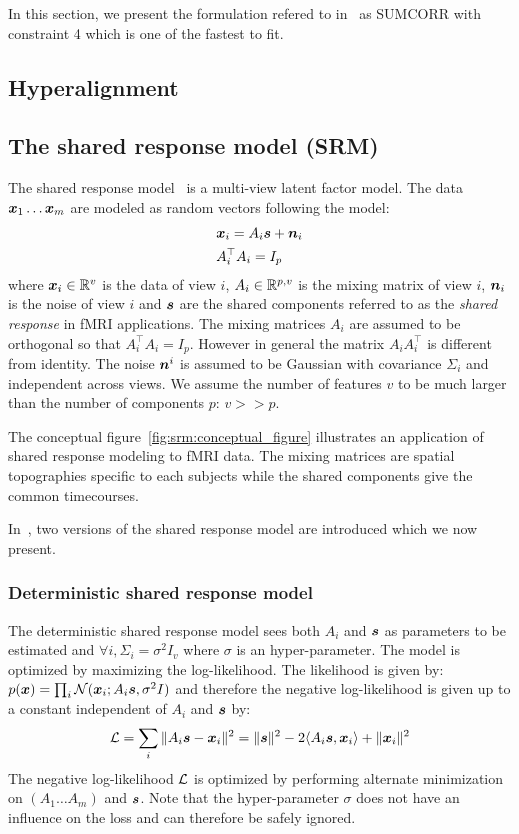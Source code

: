 In this section, we present the formulation refered to
in~\cite{nielsen2002multiset} as SUMCORR with constraint 4 which is one of the
fastest to fit.

\subsection{Hyperalignment}

\subsection{The shared response model (SRM)}
The shared response model~\cite{chen2015reduced} is a multi-view latent factor
model. The data $\boldsymbol{x}_1 \dots \boldsymbol{x}_m$ are modeled as random vectors following the model:
\begin{align}
 &\boldsymbol{x}_i = A_i \boldsymbol{s} + \boldsymbol{n}_i \\
  &A_i^{\top}A_i = I_p
  \label{eq:model:srm}
\end{align}
where $\boldsymbol{x}_i \in \mathbb{R}^v$ is the data of view $i$, $A_i \in \mathbb{R}^{p, v}$ is the
mixing matrix of view $i$, $\boldsymbol{n}_i$ is the noise of view $i$ and $\boldsymbol{s}$ are the
shared components referred to as the \emph{shared response} in fMRI applications.
The mixing matrices
$A_i$ are assumed to be orthogonal so that $A_i^{\top}A_i = I_p$. However in
general the matrix $A_i A_i^{\top}$ is different from identity. The noise
$\boldsymbol{n}^i$ is assumed to be Gaussian with covariance $\Sigma_i$ and independent
across views. We assume the number of features $v$ to be much larger than the
number of components $p$: $v >> p$.

The conceptual figure~\ref{fig:srm:conceptual_figure} illustrates an 
application of shared response modeling to fMRI data. The mixing
matrices are spatial topographies specific to each subjects while the shared
components give the common timecourses.

In~\cite{chen2015reduced, anderson2016enabling}, two versions of the shared response model are
introduced which we now present.
\subsubsection{Deterministic shared response model}
\label{sec:deterministicsrm}
The deterministic shared response model sees both $A_i$ and $\boldsymbol{s}$ as parameters to be
estimated and $\forall i, \Sigma_i=\sigma^2 I_v$ where $\sigma$ is an hyper-parameter.
The model is optimized by maximizing the log-likelihood.
The likelihood is given by: $p(\boldsymbol{x}) = \prod_i \mathcal{N}(\boldsymbol{x}_i; A_i \boldsymbol{s}, \sigma^2 I)$ and
therefore the negative log-likelihood is given up to a constant independent of
$A_i$ and $\boldsymbol{s}$ by:
\begin{align}
  \mathcal{L} = \sum_i \|A_i \boldsymbol{s} - \boldsymbol{x}_i \|^2 = \| \boldsymbol{s} \|^2 -2 \langle A_i \boldsymbol{s}, \boldsymbol{x}_i \rangle + \| \boldsymbol{x}_i \|^2
  \label{eq:detsrmloss}
\end{align}
The negative log-likelihood $\mathcal{L}$ is optimized by performing alternate minimization on $(A_1 \dots A_m)$
and $\boldsymbol{s}$. Note that the hyper-parameter $\sigma$ does not have an influence on
the loss and can therefore be safely ignored.

